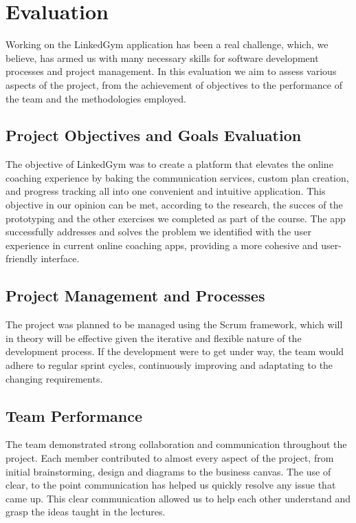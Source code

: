 

\section{Evaluation}

Working on the LinkedGym application has been a real challenge, which, we believe, has armed us with many necessary skills for software development processes and project management. In this evaluation we aim to assess various aspects of the project, from the achievement of objectives to the performance of the team and the methodologies employed.

\subsection{Project Objectives and Goals Evaluation}
The objective of LinkedGym was to create a platform that elevates the online coaching experience by baking the communication services, custom plan creation, and progress tracking all into one convenient and intuitive application. This objective in our opinion can be met, according to the research, the succes of the prototyping and the other exercises we completed as part of the course. The app successfully addresses and solves the problem we identified with the user experience in current online coaching apps, providing a more cohesive and user-friendly interface.

\subsection{Project Management and Processes}
The project was planned to be managed using the Scrum framework, which will in theory will be effective given the iterative and flexible nature of the development process. If the development were to get under way, the team would adhere to regular sprint cycles, continuously improving and adaptating to the changing requirements.

\subsection{Team Performance}
The team demonstrated strong collaboration and communication throughout the project. Each member contributed to almost every aspect of the project, from initial brainstorming, design and diagrams to the business canvas. The use of clear, to the point communication has helped us quickly resolve any issue that came up. This clear communication allowed us to help each other understand and grasp the ideas taught in the lectures.

